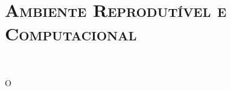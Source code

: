 \chapter{\textsc{Ambiente Reprodutível e Computacional}}~\label{app:ambiente}


\lettrine{O}{} \citet{ISI2012} 